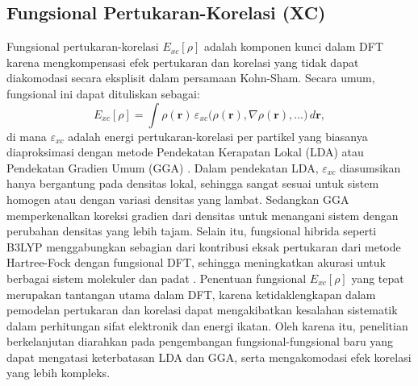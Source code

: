 \subsection{Fungsional Pertukaran-Korelasi (XC)}
Fungsional pertukaran-korelasi \(E_{xc}[\rho]\) adalah komponen kunci dalam DFT karena mengkompensasi efek pertukaran dan korelasi yang tidak dapat diakomodasi secara eksplisit dalam persamaan Kohn-Sham.
Secara umum, fungsional ini dapat dituliskan sebagai:
\begin{equation}
    E_{xc}[\rho] = \int \rho(\mathbf{r})\,\varepsilon_{xc}\Big(\rho(\mathbf{r}), \nabla\rho(\mathbf{r}), \ldots\Big) \, d\mathbf{r},
\end{equation}
di mana \(\varepsilon_{xc}\) adalah energi pertukaran-korelasi per partikel yang biasanya diaproksimasi dengan metode Pendekatan Kerapatan Lokal (LDA) atau Pendekatan Gradien Umum (GGA) \citep{Perdew1996}.
Dalam pendekatan LDA, \(\varepsilon_{xc}\) diasumsikan hanya bergantung pada densitas lokal, sehingga sangat sesuai untuk sistem homogen atau dengan variasi densitas yang lambat.
Sedangkan GGA memperkenalkan koreksi gradien dari densitas untuk menangani sistem dengan perubahan densitas yang lebih tajam.
Selain itu, fungsional hibrida seperti B3LYP menggabungkan sebagian dari kontribusi eksak pertukaran dari metode Hartree-Fock dengan fungsional DFT, sehingga meningkatkan akurasi untuk berbagai sistem molekuler dan padat \citep{Becke1993}.
Penentuan fungsional \(E_{xc}[\rho]\) yang tepat merupakan tantangan utama dalam DFT, karena ketidaklengkapan dalam pemodelan pertukaran dan korelasi dapat mengakibatkan kesalahan sistematik dalam perhitungan sifat elektronik dan energi ikatan.
Oleh karena itu, penelitian berkelanjutan diarahkan pada pengembangan fungsional-fungsional baru yang dapat mengatasi keterbatasan LDA dan GGA, serta mengakomodasi efek korelasi yang lebih kompleks.

